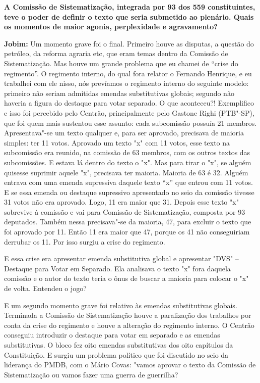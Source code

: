\textbf{A Comissão de Sistematização, integrada por 93 dos 559
constituintes, teve o poder de definir o texto que seria submetido ao
plenário. Quais os momentos de maior agonia, perplexidade e
agravamento?}

\textbf{Jobim:} Um momento grave foi o final. Primeiro houve as
disputas, a questão do petróleo, da reforma agraria etc, que eram temas
dentro da Comissão de Sistematização. Mas houve um grande problema que
eu chamei de ``crise do regimento''. O regimento interno, do qual fora
relator o Fernando Henrique, e eu trabalhei com ele nisso, nós prevíamos
o regimento interno do seguinte modelo: primeiro não seriam admitidas
emendas substitutivas globais; segundo não haveria a figura do destaque
para votar separado. O que aconteceu?! Exemplifico e isso foi percebido
pelo Centrão, principalmente pelo Gastone Righi (PTB"-SP), que foi quem
mais sustentou esse assunto: cada subcomissão possuía 21 membros.
Apresentava"-se um texto qualquer e, para ser aprovado, precisava de
maioria simples: ter 11 votos. Aprovado um texto "x" com 11 votos, esse
texto na subcomissão era reunido, na comissão de 63 membros, com os
outros textos das subcomissões. E estava lá dentro do texto o "x". Mas
para tirar o "x", se alguém quisesse suprimir aquele "x", precisava ter
maioria. Maioria de 63 é 32. Alguém entrava com uma emenda supressiva
daquele texto ``x'' que entrou com 11 votos. E se essa emenda ou
destaque supressivo apresentado no seio da comissão tivesse 31 votos não
era aprovado. Logo, 11 era maior que 31. Depois esse texto "x" sobrevive
à comissão e vai para Comissão de Sistematização, composta por 93
deputados. Também nessa precisava"-se da maioria, 47, para excluir o
texto que foi aprovado por 11. Então 11 era maior que 47, porque os 41
não conseguiriam derrubar os 11. Por isso surgiu a crise do regimento.

E essa crise era apresentar emenda substitutiva global e apresentar
"DVS" -- Destaque para Votar em Separado. Ela analisava o texto "x" fora
daquela comissão e o autor do texto teria o ônus de buscar a maioria
para colocar o "x" de volta. Entendeu o jogo?

E um segundo momento grave foi relativo às emendas substitutivas
globais. Terminada a Comissão de Sistematização houve a paralização dos
trabalhos por conta da crise do regimento e houve a alteração do
regimento interno. O Centrão conseguiu introduzir o destaque para votar
em separado e as emendas substitutivas. O bloco fez oito emendas
substitutivas dos oito capítulos da Constituição. E surgiu um problema
político que foi discutido no seio da liderança do PMDB, com o Mário
Covas: "vamos aprovar o texto da Comissão de Sistematização ou vamos
fazer uma guerra de guerrilha?

